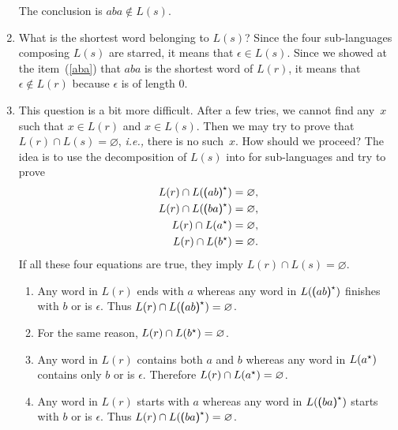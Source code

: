 \begin{enumerate}
\begin{enumerate}
    \end{enumerate}
    The conclusion is \(aba \not\in L(s)\).

    \item What is the shortest word belonging to \(L(s)\)?  Since the
      four sub-languages composing \(L(s)\) are starred, it means that
      \(\epsilon \in L(s)\). Since we showed at the item~(\ref{aba})
      that \(aba\) is the shortest word of \(L(r)\), it means that
      \(\epsilon \not\in L(r)\) because \(\epsilon\) is of length
      \(0\).

    \item This question is a bit more difficult. After a few tries, we
      cannot find any~\(x\) such that \(x \in L(r)\) and \(x \in
      L(s)\). Then we may try to prove that \(L(r) \cap L(s) =
      \varnothing\), \emph{i.e.,} there is no such~\(x\). How should we
      proceed? The idea is to use the decomposition of \(L(s)\) into
      for sub-languages and try to prove
      \begin{align*}
        L(r) \cap L(\textsf{(} ab \textsf{)}^{\star}) &= \varnothing,\\
        L(r) \cap L(\textsf{(} ba \textsf{)}^{\star}) &= \varnothing,\\
        L(r) \cap L(a^{\star}) &= \varnothing,\\
        L(r) \cap L(b^{\star}) &= \varnothing.
      \end{align*}
      If all these four equations are true, they imply
        \(L(r) \cap L(s) = \varnothing\).
      \begin{enumerate}

        \item Any word in \(L(r)\) ends with \(a\) whereas any word in
          \(L(\textsf{(} ab \textsf{)}^{\star})\) finishes with \(b\) or is
          \(\epsilon\). Thus \(L(r) \cap L(\textsf{(} ab \textsf{)}^{\star})
          = \varnothing\).

        \item For the same reason, \(L(r) \cap L(b^{\star}) =
          \varnothing\).
 
        \item Any word in \(L(r)\) contains both \(a\) and \(b\)
          whereas any word in \(L(a^{\star})\) contains only \(b\) or
          is \(\epsilon\). Therefore \(L(r) \cap L(a^{\star}) =
          \varnothing\).

        \item Any word in \(L(r)\) starts with \(a\) whereas any word
          in \(L(\textsf{(} ba \textsf{)}^{\star})\) starts with \(b\) or is
          \(\epsilon\). Thus \(L(r) \cap L(\textsf{(} ba \textsf{)}^{\star})
          = \varnothing\).


\end{enumerate}
\end{enumerate}
